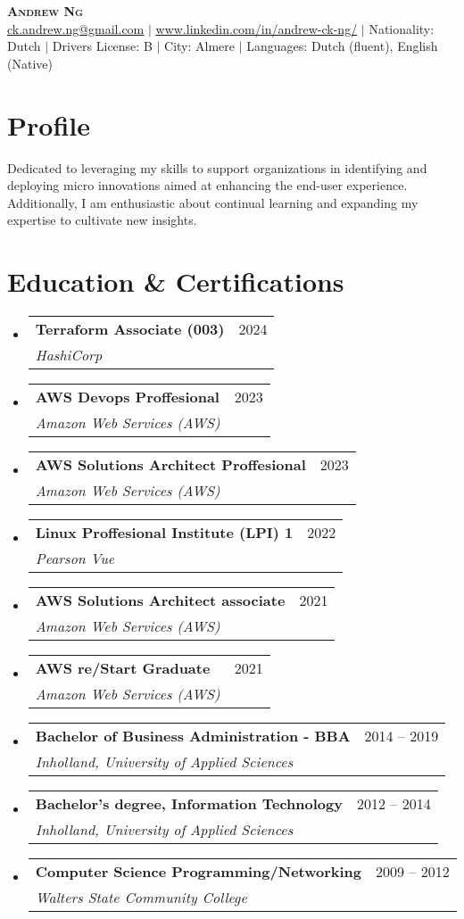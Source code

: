 \documentclass[letterpaper,11pt]{article}
\makeatletter
\newcommand{\resumeSubheading}[4]{
  \vspace{-2pt}\item
    \begin{tabular*}{0.97\textwidth}[t]{l@{\extracolsep{\fill}}r}
      \textbf{#1} & #2 \\
      \textit{\small#3} & \textit{\small #4} \\
    \end{tabular*}\vspace{-7pt}
}
\newcommand{\resumeSubHeadingListStart}{\begin{itemize}[leftmargin=0.15in, label={}]}
\newcommand{\resumeSubHeadingListEnd}{\end{itemize}}
\makeatother
\begin{document}

\begin{center}
    \textbf{\Huge \scshape Andrew Ng} \\ \vspace{1pt}
    \href{mailto:x@x.com}{\underline{ck.andrew.ng@gmail.com}} $|$ 
    \href{https://linkedin.com/in/...}{\underline{www.linkedin.com/in/andrew-ck-ng/}} $|$
    \small Nationality: Dutch $|$ 
    {\small{Drivers License: B}} $|$  {\small{City: Almere}} $|$  
    {\small{Languages: Dutch (fluent), English (Native) }}
\end{center}

\section{Profile}
{\small{Dedicated to leveraging my skills to support organizations in identifying and deploying micro innovations aimed at enhancing the end-user experience. Additionally, I am enthusiastic about continual learning and expanding my expertise to cultivate new insights.}}

\vspace{0.5cm}
\section{Education \& Certifications}
  \resumeSubHeadingListStart
    \resumeSubheading
      {Terraform Associate (003)}{2024}
      {HashiCorp}{}
    \resumeSubheading
      {AWS Devops Proffesional}{2023}
      {Amazon Web Services (AWS)}{}
    \resumeSubheading
      {AWS Solutions Architect Proffesional}{2023}
      {Amazon Web Services (AWS)}{}
    \resumeSubheading
      {Linux Proffesional Institute (LPI) 1}{2022}
      {Pearson Vue}{}
    \resumeSubheading
      {AWS Solutions Architect associate}{2021}
      {Amazon Web Services (AWS)}{}
    \resumeSubheading
      {AWS re/Start Graduate}{2021}
      {Amazon Web Services (AWS)}{}
    \resumeSubheading
      {Bachelor of Business Administration - BBA}{2014 -- 2019}
      {Inholland, University of Applied Sciences}{}
    \resumeSubheading
      {Bachelor's degree, Information Technology}{2012 -- 2014}
      {Inholland, University of Applied Sciences}{}
    \resumeSubheading
      {Computer Science Programming/Networking}{ 2009 -- 2012}
      {Walters State Community College}{}
  \resumeSubHeadingListEnd
\end{document}
